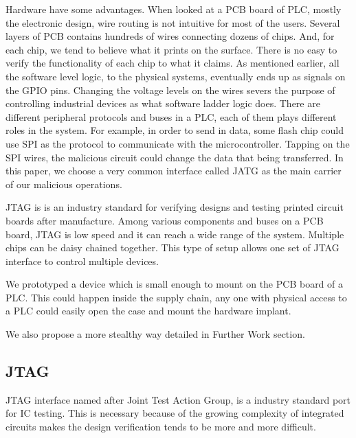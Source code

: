 Hardware have some advantages. When looked at a PCB board of PLC, mostly the electronic design, wire routing is not intuitive for most of the users. Several layers of PCB contains hundreds of wires connecting dozens of chips. And, for each chip, we tend to believe what it prints on the surface. There is no easy to verify the functionality of each chip to what it claims. As mentioned earlier, all the software level logic, to the physical systems, eventually ends up as signals on the GPIO pins. Changing the voltage levels on the wires severs the purpose of controlling industrial devices as what software ladder logic does. There are different peripheral protocols and buses in a PLC, each of them plays different roles in the system. For example, in order to send in data, some flash chip could use SPI as the protocol to communicate with the microcontroller. Tapping on the SPI wires, the malicious circuit could change the data that being transferred. In this paper, we choose a very common interface called JATG as the main carrier of our malicious operations.   

JTAG is is an industry standard for verifying designs and testing printed circuit boards after manufacture. Among various components and buses on a PCB board, JTAG is low speed and it can reach a wide range of the system. Multiple chips can be daisy chained together. This type of setup allows one set of JTAG interface to control multiple devices.

We prototyped a device which is small enough to mount on the PCB board of a PLC. This could happen inside the supply chain, any one with physical access to a PLC could easily open the case and mount the hardware implant.

We also propose a more stealthy way detailed in Further Work section.



\subsection{JTAG}
JTAG interface named after Joint Test Action Group, is a industry standard port for IC testing. This is necessary because of the growing complexity of integrated circuits makes the design verification tends to be more and more difficult.

